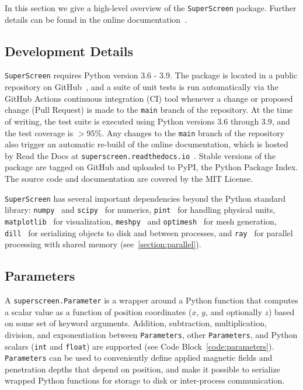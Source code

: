 \documentclass[final,3p,times]{elsarticle}
\newcommand{\inline}[1]{\texttt{#1}\xspace}
\newcommand{\SuperScreen}{\inline{SuperScreen}}
\begin{document}
In this section we give a high-level overview of the \SuperScreen package. Further details can be found in the online documentation~\cite{superscreen-rtd}.

\subsection{Development Details}
\label{section:overview:development}

\SuperScreen requires Python version 3.6 - 3.9. The package is located in a public repository on GitHub~\cite{superscreen}, and a suite of unit tests is run automatically via the GitHub Actions continuous integration (CI) tool whenever a change or proposed change (Pull Request) is made to the \inline{main} branch of the repository. At the time of writing, the test suite is executed using Python versions 3.6 through 3.9, and the test coverage is $>95\%$. Any changes to the \inline{main} branch of the repository also trigger an automatic re-build of the online documentation, which is hosted by Read the Docs at \inline{superscreen.readthedocs.io}~\cite{superscreen-rtd}. Stable versions of the package are tagged on GitHub and uploaded to PyPI, the Python Package Index. The source code and documentation are covered by the MIT License.

\SuperScreen has several important dependencies beyond the Python standard library: \inline{numpy}~\cite{2020NumPy-Array} and \inline{scipy}~\cite{2020SciPy-NMeth} for numerics, \inline{pint}~\cite{Grecco} for handling physical units, \inline{matplotlib}~\cite{Hunter_2007} for visualization, \inline{meshpy}~\cite{Klockner,Shewchuk,shewchuk96b} and \inline{optimesh}~\cite{nico_schlomer_adam_dobrawy_2021} for mesh generation, \inline{dill}~\cite{McKerns} for serializing objects to disk and between processes, and \inline{ray}~\cite{ray_2018,ray-docs} for parallel processing with shared memory (see~\ref{section:parallel}).

\subsection{Parameters}
\label{section:overview:parameter}

A \inline{superscreen.Parameter} is a wrapper around a Python function that computes a scalar value as a function of position coordinates ($x$, $y$, and optionally $z$) based on some set of keyword arguments. Addition, subtraction, multiplication, division, and exponentiation between \inline{Parameters}, other \inline{Parameters}, and Python scalars (\inline{int} and \inline{float}) are supported (see Code Block~\ref{code:parameters}). \inline{Parameters} can be used to conveniently define applied magnetic fields and penetration depths that depend on position, and make it possible to serialize wrapped Python functions for storage to disk or inter-process communication.
\end{document}
